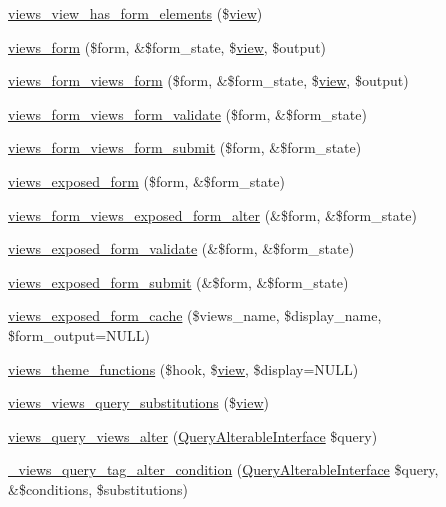 \begin{DoxyCompactItemize}
\item 
\hyperlink{views_8module_a5e3621086e4f50ae1e7cfe14392c6bca}{views\_\-view\_\-has\_\-form\_\-elements} (\$\hyperlink{classview}{view})
\item 
\hyperlink{views_8module_ad2b3623cab717e77713170df21927c92}{views\_\-form} (\$form, \&\$form\_\-state, \$\hyperlink{classview}{view}, \$output)
\item 
\hyperlink{views_8module_a0597f9e730eb438da7c5e91eb9eec685}{views\_\-form\_\-views\_\-form} (\$form, \&\$form\_\-state, \$\hyperlink{classview}{view}, \$output)
\item 
\hyperlink{views_8module_a1d7ebdb64055b2c813237617e8be7241}{views\_\-form\_\-views\_\-form\_\-validate} (\$form, \&\$form\_\-state)
\item 
\hyperlink{views_8module_a7fbf15fdfa7d026d5d8735d86d1c3fcf}{views\_\-form\_\-views\_\-form\_\-submit} (\$form, \&\$form\_\-state)
\item 
\hyperlink{views_8module_a73e0d571664dc78bbddc65be02bc0a2e}{views\_\-exposed\_\-form} (\$form, \&\$form\_\-state)
\item 
\hyperlink{views_8module_a1b2f933056d6e97e743b462d39e1d535}{views\_\-form\_\-views\_\-exposed\_\-form\_\-alter} (\&\$form, \&\$form\_\-state)
\item 
\hyperlink{views_8module_aabe2634331d3b98e6f229d3392d2b5ce}{views\_\-exposed\_\-form\_\-validate} (\&\$form, \&\$form\_\-state)
\item 
\hyperlink{views_8module_a931d81415d29b2c8bb3ec3a2e9edbfea}{views\_\-exposed\_\-form\_\-submit} (\&\$form, \&\$form\_\-state)
\item 
\hyperlink{views_8module_a5db0d5532dfe2507275360e0738e4d64}{views\_\-exposed\_\-form\_\-cache} (\$views\_\-name, \$display\_\-name, \$form\_\-output=NULL)
\item 
\hyperlink{views_8module_a5c5e28542b853cf61c0540d05d057e40}{views\_\-theme\_\-functions} (\$hook, \$\hyperlink{classview}{view}, \$display=NULL)
\item 
\hyperlink{views_8module_af14b36b042237ca5f054fc19c44a188c}{views\_\-views\_\-query\_\-substitutions} (\$\hyperlink{classview}{view})
\item 
\hyperlink{views_8module_a621a7deea033fadbb8de49ef7795a8b7}{views\_\-query\_\-views\_\-alter} (\hyperlink{interfaceQueryAlterableInterface}{QueryAlterableInterface} \$query)
\item 
\hyperlink{views_8module_a51cb108c148c7478b50e6262e216a17d}{\_\-views\_\-query\_\-tag\_\-alter\_\-condition} (\hyperlink{interfaceQueryAlterableInterface}{QueryAlterableInterface} \$query, \&\$conditions, \$substitutions)

\end{DoxyCompactItemize}
